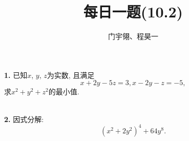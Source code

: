 \documentclass{article}
\title{每日一题(10.2)}
\author{\kaishu 门宇翎、程昊一}
\begin{document}
\maketitle
\textbf{1. }已知$x$, $y$, $z$为实数, 且满足
\[x+2y-5z=3, x-2y-z=-5,\]
求$x^2+y^2+z^2$的最小值.\\
\\\par
\textbf{2. }因式分解:
\[\left(x^2+2y^2\right)^4+64y^8.\]
\end{document}

